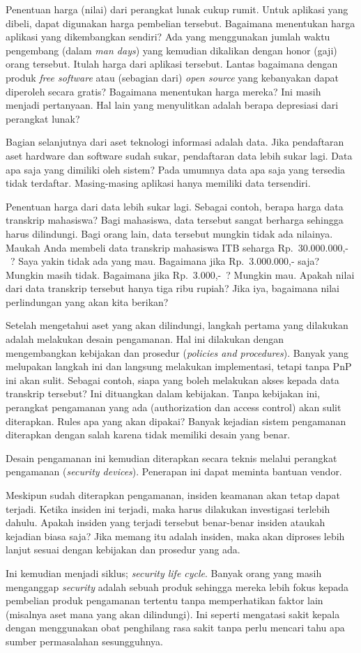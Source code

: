 Penentuan harga (nilai) dari perangkat lunak cukup rumit. Untuk aplikasi yang
dibeli, dapat digunakan harga pembelian tersebut. Bagaimana menentukan harga
aplikasi yang dikembangkan sendiri? Ada yang menggunakan jumlah waktu
pengembang (dalam {\em man days}) yang kemudian dikalikan dengan honor (gaji)
orang tersebut. Itulah harga dari aplikasi tersebut. Lantas bagaimana dengan
produk {\em free software} atau (sebagian dari) {\em open source} yang
kebanyakan dapat diperoleh secara gratis? Bagaimana menentukan harga mereka?
Ini masih menjadi pertanyaan. Hal lain yang menyulitkan adalah berapa
depresiasi dari perangkat lunak?

Bagian selanjutnya dari aset teknologi informasi adalah data. Jika pendaftaran
aset hardware dan software sudah sukar, pendaftaran data lebih sukar lagi. Data
apa saja yang dimiliki oleh sistem? Pada umumnya data apa saja yang tersedia
tidak terdaftar. Masing-masing aplikasi hanya memiliki data tersendiri.

Penentuan harga dari data lebih sukar lagi. Sebagai contoh, berapa harga data
transkrip mahasiswa? Bagi mahasiswa, data tersebut sangat berharga sehingga
harus dilindungi. Bagi orang lain, data tersebut mungkin tidak ada nilainya.
Maukah Anda membeli data transkrip mahasiswa ITB seharga Rp.~30.000.000,-~?
Saya yakin tidak ada yang mau. Bagaimana jika Rp.~3.000.000,- saja? Mungkin
masih tidak. Bagaimana jika Rp.~3.000,-~? Mungkin mau. Apakah nilai dari data
transkrip tersebut hanya tiga ribu rupiah? Jika iya, bagaimana nilai
perlindungan yang akan kita berikan?


Setelah mengetahui aset yang akan dilindungi, langkah pertama yang dilakukan
adalah melakukan desain pengamanan. Hal ini dilakukan dengan mengembangkan
kebijakan dan prosedur ({\em policies and procedures}). Banyak yang melupakan
langkah ini dan langsung melakukan implementasi, tetapi tanpa PnP ini akan
sulit. Sebagai contoh, siapa yang boleh melakukan akses kepada data transkrip
tersebut? Ini dituangkan dalam kebijakan. Tanpa kebijakan ini, perangkat
pengamanan yang ada (authorization dan access control) akan sulit diterapkan.
Rules apa yang akan dipakai? Banyak kejadian sistem pengamanan diterapkan
dengan salah karena tidak memiliki desain yang benar.

Desain pengamanan ini kemudian diterapkan secara teknis melalui perangkat
pengamanan ({\em security devices}). Penerapan ini dapat meminta bantuan
vendor. 

Meskipun sudah diterapkan pengamanan, insiden keamanan akan tetap dapat
terjadi. Ketika insiden ini terjadi, maka harus dilakukan investigasi terlebih
dahulu. Apakah insiden yang terjadi tersebut benar-benar insiden ataukah
kejadian biasa saja? Jika memang itu adalah insiden, maka akan diproses lebih
lanjut sesuai dengan kebijakan dan prosedur yang ada.

Ini kemudian menjadi siklus; {\em security life cycle}. Banyak orang yang masih
menganggap {\em security} adalah sebuah produk sehingga mereka lebih fokus
kepada pembelian produk pengamanan tertentu tanpa memperhatikan faktor lain
(misalnya aset mana yang akan dilindungi). Ini seperti mengatasi sakit kepala
dengan menggunakan obat penghilang rasa sakit tanpa perlu mencari tahu apa
sumber permasalahan sesungguhnya.
